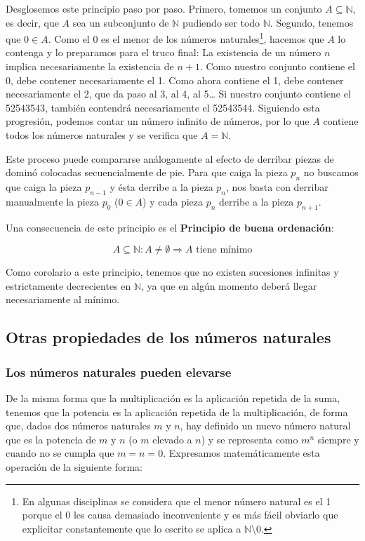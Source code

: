 Desglosemos este principio paso por paso.
Primero, tomemos un conjunto $A \subseteq \mathbb{N}$, es decir, que $A$ sea un subconjunto de $\mathbb{N}$ pudiendo ser todo $\mathbb{N}$.
Segundo, tenemos que $0 \in A$.
Como el 0 es el menor de los números naturales\footnote{%
	En algunas disciplinas se considera que el menor número natural es el 1 porque el 0 les causa demasiado inconveniente y es más fácil obviarlo que explicitar constantemente que lo escrito se aplica a $\mathbb{N}$\textbackslash0.
}, hacemos que $A$ lo contenga y lo preparamos para el truco final:
La existencia de un número $n$ implica necesariamente la existencia de $n+1$.
Como nuestro conjunto contiene el 0, debe contener necesariamente el 1.
Como ahora contiene el 1, debe contener necesariamente el 2, que da paso al 3, al 4, al 5\ldots
Si nuestro conjunto contiene el 52543543, también contendrá necesariamente el 52543544.
Siguiendo esta progresión, podemos contar un número infinito de números, por lo que $A$ contiene todos los números naturales y se verifica que $A=\mathbb{N}$.

Este proceso puede compararse análogamente al efecto de derribar piezas de dominó colocadas secuencialmente de pie.
Para que caiga la pieza $p_n$ no buscamos que caiga la pieza $p_{n-1}$ y ésta derribe a la pieza $p_n$, nos basta con derribar manualmente la pieza $p_0$ ($0 \in A$) y cada pieza $p_n$ derribe a la pieza $p_{n+1}$.

Una consecuencia de este principio es el \textbf{Principio de buena ordenación}:

\[A \subseteq \mathbb{N} : A \neq \emptyset \Rightarrow A\text{ tiene mínimo}\]

Como corolario a este principio, tenemos que no existen sucesiones infinitas y estrictamente decrecientes en $\mathbb{N}$, ya que en algún momento deberá llegar necesariamente al mínimo.

\pagebreak

\subsection{Otras propiedades de los números naturales}

\subsubsection{Los números naturales pueden elevarse}

De la misma forma que la multiplicación es la aplicación repetida de la suma, tenemos que la potencia es la aplicación repetida de la multiplicación, de forma que, dados dos números naturales $m$ y $n$, hay definido un nuevo número natural que es la potencia de $m$ y $n$ (o $m$ elevado a $n$) y se representa como $m^n$ siempre y cuando no se cumpla que $m=n=0$.
Expresamos matemáticamente esta operación de la siguiente forma:

